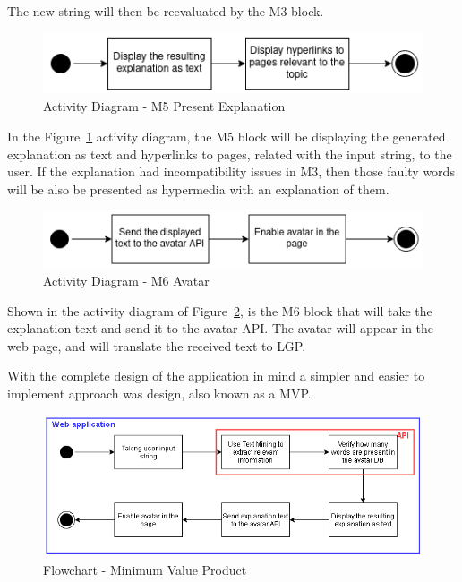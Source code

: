 The new string will then be reevaluated by the M3 block.

\begin{figure}[H]
\centering
\includegraphics[width=\textwidth,keepaspectratio]{ch4/assets/M5.png}
\caption[Activity Diagram Present Explanation Module]{Activity Diagram - M5 Present Explanation}
\label{fig:M5}
\end{figure}

In the Figure~\ref{fig:M5} activity diagram, the M5 block will be displaying the generated explanation as text and hyperlinks to pages, related with the input string, to the user.
If the explanation had incompatibility issues in M3, then those faulty words will be also be presented as hypermedia with an explanation of them.

\begin{figure}[H]
\centering
\includegraphics[width=\textwidth,keepaspectratio]{ch4/assets/M6.png}
\caption[Activity Diagram Avatar Module]{Activity Diagram - M6 Avatar}
\label{fig:M6}
\end{figure}

Shown in the activity diagram of Figure~\ref{fig:M6}, is the M6 block that will take the explanation text and send it to the avatar \gls{API}.
The avatar will appear in the web page, and will translate the received text to \gls{LGP}.

With the complete design of the application in mind a simpler and easier to implement approach was design, also known as a \gls{MVP}.

\begin{figure}[H]
\centering
\includegraphics[width=\textwidth,keepaspectratio]{ch4/assets/mvp_2.png}
\caption[Flowchart Minimun Value Product]{Flowchart - Minimum Value Product}
\label{fig:mvp}
\end{figure}

